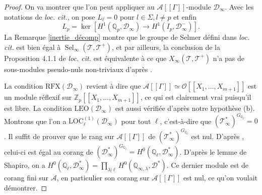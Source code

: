 \documentclass[12pt]{amsart}
\newcommand\bQ{\mathbb{Q}}
\newcommand\Zp{{\mathbb{Z}_{p}}}
\newcommand\cA{\mathcal{A}}
\newcommand\cD{\mathcal{D}}
\newcommand\cO{\mathcal{O}}
\newcommand\cT{\mathcal{T}}
\DeclareMathOperator{\Sel}{Sel}
\theoremstyle{defstyle}
\theoremstyle{thmstyle}
\begin{document}
\begin{proof}
	On va montrer que l'on peut appliquer \cite[Proposition 4.1.1]{greenberg2015structure} au $\cA[[\Gamma]]$-module $\cD_\infty$. Avec les notations de \textit{loc. cit.}, on pose $L_\ell=0$ pour $l \in \Sigma, l\neq p$ et enfin 
	$$L_p=\ker\left[H^1(\bQ_p,\cD_\infty) \longrightarrow H^1(I_p,\cD_\infty^-)\right].$$
	La Remarque \ref{inertie_décomp} montre que le groupe de Selmer défini dans \textit{loc. cit.} est bien égal à $\Sel_\infty(\cT,\cT^+)$, et par ailleurs, la conclusion de la Proposition 4.1.1 de \textit{loc. cit.} est équivalente à ce que $X_\infty(\cT,\cT^+)$ n'a pas de sous-modules pseudo-nuls non-triviaux d'après \cite[Proposition 2.4]{greenberg2006structure}. 
	
	La condition $\textrm{RFX}(\cD_\infty)$ revient à dire que $\cA[[\Gamma]]\simeq \cO[[X_1,\ldots,X_{m+1}]]$ est un module réflexif sur $\Zp[[X_1,\ldots,X_{m+1}]]$, ce qui est clairement vrai puisqu'il est libre. La condition $\textrm{LEO}(\cD_\infty)$ est aussi vérifiée d'après notre hypothèse (b). Montrons que l'on a $\textrm{LOC}_\ell^{(1)}(\cD_\infty)$ pour tout $\ell$, c'est-à-dire que $(\cT_\infty^*)^{G_{\bQ_\ell}}=0$. Il suffit de prouver que le rang sur $\cA[[\Gamma]]$ de $(\cT_\infty^*)^{G_{\bQ_\ell}}$ est nul. D'après \cite[Proposition 3.10]{greenberg2006structure}, celui-ci est égal au corang de $\left(\cD_\infty^*\right)^{G_{\bQ_\ell}}=H^0(\bQ_\ell,\cD_\infty^*)$. D'après le lemme de Shapiro, on a $H^0(\bQ_\ell,\cD_\infty^*) = \prod_{\lambda|\ell} H^0(\bQ_{\infty,\lambda},\cD^*)$. Ce dernier module est de corang fini sur $\cA$, en particulier son corang sur $\cA[[\Gamma]]$ est nul, ce qu'on voulait démontrer.
	

\end{proof}
\end{document}
